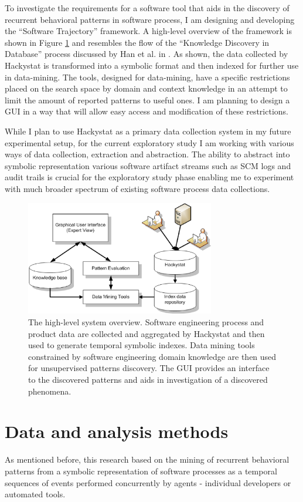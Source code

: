 \documentclass{sig-alternate}
\begin{document}
To investigate the requirements for a software tool that aids in the discovery of recurrent behavioral patterns in software process, I am designing and developing the ``Software Trajectory'' framework. A high-level overview of the framework is shown in Figure \ref{fig:system_overview} and resembles the flow of the ``Knowledge Discovery in Database'' process discussed by Han et al. in \cite{citeulike:709476}. As shown, the data collected by Hackystat is transformed into a symbolic format and then indexed for further use in data-mining. The tools, designed for data-mining, have a specific restrictions placed on the search space by domain and context knowledge in an attempt to limit the amount of reported patterns to useful ones. I am planning to design a GUI in a way that will allow easy access and modification of these restrictions.

While I plan to use Hackystat as a primary data collection system in my future experimental setup, for the current exploratory study I am working with various ways of data collection, extraction and abstraction. The ability to abstract into symbolic representation various software artifact streams such as SCM logs and audit trails is crucial for the exploratory study phase enabling me to experiment with much broader spectrum of existing software process data collections.

\begin{figure}[tbp]
   \centering
   \includegraphics[height=50mm]{system_overview.eps}
   \caption{The high-level system overview. Software engineering process and product data are collected and aggregated by Hackystat and then used to generate temporal symbolic indexes. Data mining tools constrained by software engineering domain knowledge are then used for unsupervised patterns discovery. The GUI provides an interface to the discovered patterns and aids in investigation of a discovered phenomena.}
   \label{fig:system_overview}
\end{figure}
 
\section{Data and analysis methods}
As mentioned before, this research based on the mining of recurrent behavioral patterns from a symbolic representation of software processes as a temporal sequences of events performed concurrently by agents - individual developers or automated tools. 
\end{document}
